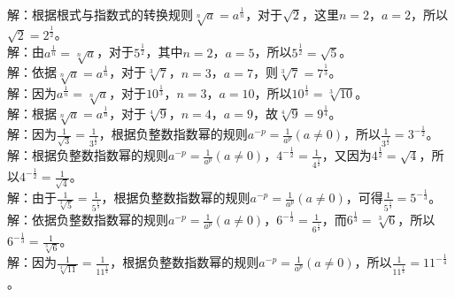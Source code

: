 \documentclass{ctexart}
\newenvironment{MyAnswer}[1][] %
{
    \begin{tcolorbox}[breakable, colframe=blue]
    \begin{Answer}[#1] \color{blue} \kaishu
        }  %
    {\end{Answer}
\end{tcolorbox}
}
\begin{document}
\begin{MyAnswer}[ref={ex:basic - radical - exponential}]
    \Question {}\\
    解：根据根式与指数式的转换规则\(\sqrt[n]{a}=a^{\frac{1}{n}}\)，对于\(\sqrt{2}\)，这里\(n = 2\)，\(a = 2\)，所以\(\sqrt{2}=2^{\frac{1}{2}}\)。
    \Question {}\\
    解：由\(a^{\frac{1}{n}}=\sqrt[n]{a}\)，对于\(5^{\frac{1}{2}}\)，其中\(n = 2\)，\(a = 5\)，所以\(5^{\frac{1}{2}}=\sqrt{5}\)。
    \Question {}\\
    解：依据\(\sqrt[n]{a}=a^{\frac{1}{n}}\)，对于\(\sqrt[3]{7}\)，\(n = 3\)，\(a = 7\)，则\(\sqrt[3]{7}=7^{\frac{1}{3}}\)。
    \Question {}\\
    解：因为\(a^{\frac{1}{n}}=\sqrt[n]{a}\)，对于\(10^{\frac{1}{3}}\)，\(n = 3\)，\(a = 10\)，所以\(10^{\frac{1}{3}}=\sqrt[3]{10}\)。
    \Question {}\\
    解：根据\(\sqrt[n]{a}=a^{\frac{1}{n}}\)，对于\(\sqrt[4]{9}\)，\(n = 4\)，\(a = 9\)，故\(\sqrt[4]{9}=9^{\frac{1}{4}}\)。
    \Question {}\\
    解：因为\(\frac{1}{\sqrt{3}}=\frac{1}{3^{\frac{1}{2}}}\)，根据负整数指数幂的规则\(a^{-p}=\frac{1}{a^{p}}(a\neq0)\)，所以\(\frac{1}{3^{\frac{1}{2}}}=3^{-\frac{1}{2}}\)。
    \Question {}\\
    解：根据负整数指数幂的规则\(a^{-p}=\frac{1}{a^{p}}(a\neq0)\)，\(4^{-\frac{1}{2}}=\frac{1}{4^{\frac{1}{2}}}\)，又因为\(4^{\frac{1}{2}}=\sqrt{4}\)，所以\(4^{-\frac{1}{2}}=\frac{1}{\sqrt{4}}\)。
    \Question {}\\
    解：由于\(\frac{1}{\sqrt[3]{5}}=\frac{1}{5^{\frac{1}{3}}}\)，根据负整数指数幂的规则\(a^{-p}=\frac{1}{a^{p}}(a\neq0)\)，可得\(\frac{1}{5^{\frac{1}{3}}}=5^{-\frac{1}{3}}\)。
    \Question {}\\
    解：依据负整数指数幂的规则\(a^{-p}=\frac{1}{a^{p}}(a\neq0)\)，\(6^{-\frac{1}{3}}=\frac{1}{6^{\frac{1}{3}}}\)，而\(6^{\frac{1}{3}}=\sqrt[3]{6}\)，所以\(6^{-\frac{1}{3}}=\frac{1}{\sqrt[3]{6}}\)。
    \Question {}\\
    解：因为\(\frac{1}{\sqrt[4]{11}}=\frac{1}{11^{\frac{1}{4}}}\)，根据负整数指数幂的规则\(a^{-p}=\frac{1}{a^{p}}(a\neq0)\)，所以\(\frac{1}{11^{\frac{1}{4}}}=11^{-\frac{1}{4}}\)。
\end{MyAnswer}
\end{document}
